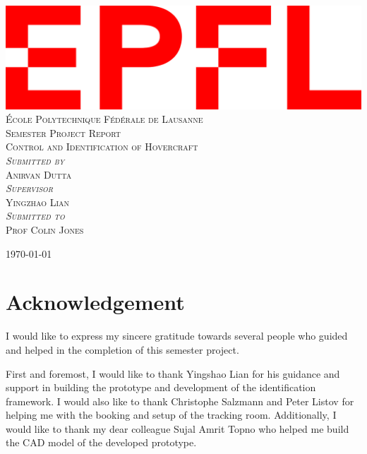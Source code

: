 \documentclass[12pt,titlepage]{article}
\begin{document}
\begin{titlepage}
	\centering
    \includegraphics[width=0.5\linewidth]{Images/epfl.png}\\[0.25cm] 	%
    \textsc{\LARGE École Polytechnique Fédérale de Lausanne}\\ \vspace{5cm}
    \textsc{\LARGE Semester Project Report}\\ \vspace{2cm}
    \textsc{\Large Control and Identification of Hovercraft}\\ 
    \vspace{4cm}
    \textsc{\large \textit{Submitted by}}\\ 
    \vspace{7pt}
    \textsc{\large Anirvan Dutta}\\
    \vspace{1cm }
    \textsc{\large  \textit{Supervisor}}\\ 
    \vspace{7pt}
    \textsc{\large Yingzhao Lian}\\
    \vspace{1cm}
    \textsc{\large  \textit{Submitted to}}\\ 
    \vspace{7pt}
    \textsc{\large Prof Colin Jones}\\
    \vspace{1cm}
    
    
    \vspace{\fill}
    \today
\end{titlepage}
\restoregeometry

\tableofcontents
\newpage

\section{Acknowledgement}
I would like to express my sincere gratitude towards several people who guided and helped in the completion of this semester project. 

First and foremost, I would like to thank Yingshao Lian for his guidance and support in building the prototype and development of the identification framework. I would also like to thank Christophe Salzmann and Peter Listov for helping me with the booking and setup of the tracking room. Additionally, I would like to thank my dear colleague Sujal Amrit Topno who helped me build the CAD model of the developed prototype. 
\end{document}
